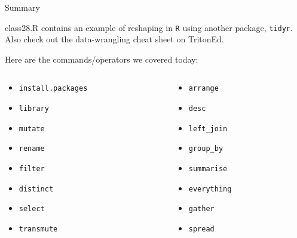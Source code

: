 \documentclass[ignorenonframetext,]{beamer}
\begin{document}
\begin{frame}[fragile]{Summary}

class28.R contains an example of reshaping in \texttt{R} using another
package, \texttt{tidyr}. Also check out the data-wrangling cheat sheet
on TritonEd.

Here are the commands/operators we covered today:

\begin{columns}
	\begin{column}{0.5\textwidth}
		\begin{itemize}
			\item \texttt{install.packages}
			\item \texttt{library}
			\item \texttt{mutate}
			\item \texttt{rename}
			\item \texttt{filter}
			\item \texttt{distinct}
			\item \texttt{select}
			\item \texttt{transmute}
		\end{itemize}
	\end{column}
	\begin{column}{0.5\textwidth}
		\begin{itemize}
			\item \texttt{arrange}
			\item \texttt{desc}
			\item \texttt{left\_join}
			\item \texttt{group\_by}
			\item \texttt{summarise}
			\item \texttt{everything}
			\item \texttt{gather}
			\item \texttt{spread}
		\end{itemize}
	\end{column}
\end{columns}

\end{frame}
\end{document}
